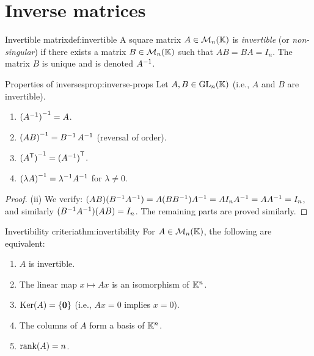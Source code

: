 \section{Inverse matrices}\label{sec:inverse-matrices}

\begin{definition}{Invertible matrix}{def:invertible}
A square matrix $A\in\mathcal{M}_n({\mathbb{K}})$ is \emph{invertible} (or
\emph{non-singular}) if there exists a matrix $B\in\mathcal{M}_n({\mathbb{K}})$ such
that $AB = BA = I_n$. The matrix $B$ is unique and is denoted
${A}^{-1}$.
\end{definition}

\begin{proposition}{Properties of inverses}{prop:inverse-props}
Let $A,B\in\operatorname{GL}_n({\mathbb{K}})$ (i.e., $A$ and $B$ are invertible).
\begin{enumerate}[label=(\roman*)]
  \item ${({A}^{-1})}^{-1} = A$.
  \item ${(AB)}^{-1} = {B}^{-1}\,{A}^{-1}$ \quad (reversal of order).
  \item ${({A}^{\mathsf{T}})}^{-1} = {({A}^{-1})}^{\mathsf{T}}$.
  \item ${(\lambda A)}^{-1} = \lambda^{-1}{A}^{-1}$ for $\lambda\neq 0$.
\end{enumerate}
\end{proposition}

\begin{proof}
(ii) We verify: $(AB)({B}^{-1}{A}^{-1}) = A(B{B}^{-1}){A}^{-1}
= AI_n{A}^{-1} = A{A}^{-1} = I_n$, and similarly
$({B}^{-1}{A}^{-1})(AB) = I_n$.
The remaining parts are proved similarly.
\end{proof}

\begin{theorem}{Invertibility criteria}{thm:invertibility}
For $A\in\mathcal{M}_n({\mathbb{K}})$, the following are equivalent:
\begin{enumerate}[label=(\roman*)]
  \item $A$ is invertible.
  \item The linear map $x\mapsto Ax$ is an isomorphism of ${\mathbb{K}}^n$.
  \item $\operatorname{Ker}(A) = \left\{\mathbf{0}\right\}$ (i.e., $Ax = 0$ implies $x = 0$).
  \item The columns of $A$ form a basis of ${\mathbb{K}}^n$.
  \item $\operatorname{rank}(A) = n$.
\end{enumerate}
\end{theorem}

